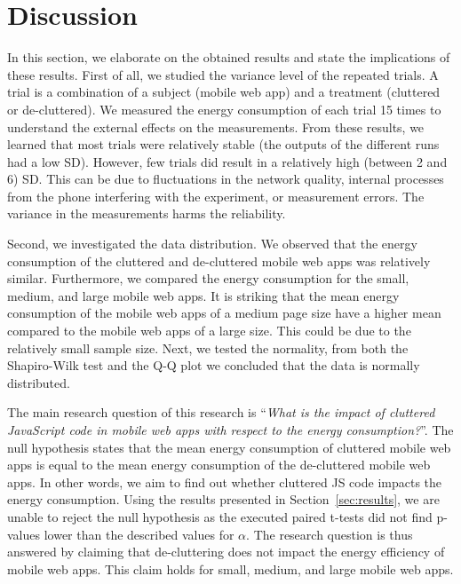 \section{Discussion}


In this section, we elaborate on the obtained results and state the implications of these results.
First of all, we studied the variance level of the repeated trials. A trial is a combination of a subject (mobile web app) and a treatment (cluttered or de-cluttered). We measured the energy consumption of each trial 15 times to understand the external effects on the measurements. From these results, we learned that most trials were relatively stable (the outputs of the different runs had a low SD). However, few trials did result in a relatively high (between 2 and 6) SD. This can be due to fluctuations in the network quality, internal processes from the phone interfering with the experiment, or measurement errors. The variance in the measurements harms the reliability.

Second, we investigated the data distribution. We observed that the energy consumption of the cluttered and de-cluttered mobile web apps was relatively similar. Furthermore, we compared the energy consumption for the small, medium, and large mobile web apps. It is striking that the mean energy consumption of the mobile web apps of a medium page size have a higher mean compared to the mobile web apps of a large size. This could be due to the relatively small sample size. %
Next, we tested the normality, from both the Shapiro-Wilk test and the Q-Q plot we concluded that the data is normally distributed.

The main research question of this research is ``\textit{What is the impact of cluttered JavaScript code in mobile web apps with respect to the energy consumption?}''. The null hypothesis states that the mean energy consumption of cluttered mobile web apps is equal to the mean energy consumption of the de-cluttered mobile web apps. In other words, we aim to find out whether cluttered JS code impacts the energy consumption. Using the results presented in Section~\ref{sec:results}, we are unable to reject the null hypothesis as the executed paired t-tests did not find p-values lower than the described values for $\alpha$. The research question is thus answered by claiming that de-cluttering does not impact the energy efficiency of mobile web apps. This claim holds for small, medium, and large mobile web apps.


